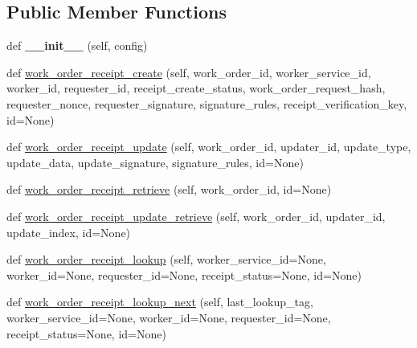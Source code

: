 \subsection*{Public Member Functions}
\begin{DoxyCompactItemize}
\item 
\mbox{\label{classavalon__sdk_1_1connector_1_1direct_1_1jrpc_1_1jrpc__work__order__receipt_1_1JRPCWorkOrderReceiptImpl_a3becd18e957222cceaebc8d23893201e}} 
def {\bfseries \+\_\+\+\_\+init\+\_\+\+\_\+} (self, config)
\item 
def \hyperlink{classavalon__sdk_1_1connector_1_1direct_1_1jrpc_1_1jrpc__work__order__receipt_1_1JRPCWorkOrderReceiptImpl_ae2cbec3e402c983c0560d2b98c537f07}{work\+\_\+order\+\_\+receipt\+\_\+create} (self, work\+\_\+order\+\_\+id, worker\+\_\+service\+\_\+id, worker\+\_\+id, requester\+\_\+id, receipt\+\_\+create\+\_\+status, work\+\_\+order\+\_\+request\+\_\+hash, requester\+\_\+nonce, requester\+\_\+signature, signature\+\_\+rules, receipt\+\_\+verification\+\_\+key, id=None)
\item 
def \hyperlink{classavalon__sdk_1_1connector_1_1direct_1_1jrpc_1_1jrpc__work__order__receipt_1_1JRPCWorkOrderReceiptImpl_ad8523ddc94e5f3cd9836f2baf820e843}{work\+\_\+order\+\_\+receipt\+\_\+update} (self, work\+\_\+order\+\_\+id, updater\+\_\+id, update\+\_\+type, update\+\_\+data, update\+\_\+signature, signature\+\_\+rules, id=None)
\item 
def \hyperlink{classavalon__sdk_1_1connector_1_1direct_1_1jrpc_1_1jrpc__work__order__receipt_1_1JRPCWorkOrderReceiptImpl_ad4a088c0a4999994ff61ae696b9b4c4c}{work\+\_\+order\+\_\+receipt\+\_\+retrieve} (self, work\+\_\+order\+\_\+id, id=None)
\item 
def \hyperlink{classavalon__sdk_1_1connector_1_1direct_1_1jrpc_1_1jrpc__work__order__receipt_1_1JRPCWorkOrderReceiptImpl_aaab5946fb57879475620ae202d039654}{work\+\_\+order\+\_\+receipt\+\_\+update\+\_\+retrieve} (self, work\+\_\+order\+\_\+id, updater\+\_\+id, update\+\_\+index, id=None)
\item 
def \hyperlink{classavalon__sdk_1_1connector_1_1direct_1_1jrpc_1_1jrpc__work__order__receipt_1_1JRPCWorkOrderReceiptImpl_ace4ee01a071cd19dc7a125227fd0994d}{work\+\_\+order\+\_\+receipt\+\_\+lookup} (self, worker\+\_\+service\+\_\+id=None, worker\+\_\+id=None, requester\+\_\+id=None, receipt\+\_\+status=None, id=None)
\item 
def \hyperlink{classavalon__sdk_1_1connector_1_1direct_1_1jrpc_1_1jrpc__work__order__receipt_1_1JRPCWorkOrderReceiptImpl_a5aea6a56cf260bd4d0d12d8d55cd5212}{work\+\_\+order\+\_\+receipt\+\_\+lookup\+\_\+next} (self, last\+\_\+lookup\+\_\+tag, worker\+\_\+service\+\_\+id=None, worker\+\_\+id=None, requester\+\_\+id=None, receipt\+\_\+status=None, id=None)
\end{DoxyCompactItemize}


